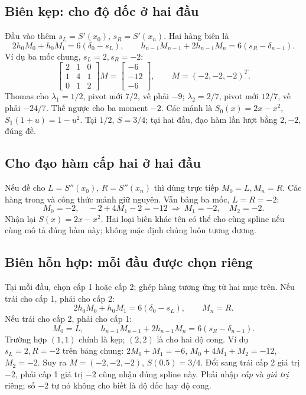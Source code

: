 \subsection{Biên kẹp: cho độ dốc ở hai đầu}
\label{sec:spline-clamped}
Đầu vào thêm $s_L=S'(x_0)$, $s_R=S'(x_n)$. Hai hàng biên là
\[
2h_0M_0+h_0M_1=6(\delta_0-s_L),\qquad
h_{n-1}M_{n-1}+2h_{n-1}M_n=6(s_R-\delta_{n-1}).
\]
Ví dụ ba mốc chung, $s_L=2,s_R=-2$:
\[
\begin{bmatrix}2&1&0\\1&4&1\\0&1&2\end{bmatrix}M
=\begin{bmatrix}-6\\-12\\-6\end{bmatrix},\qquad M=(-2,-2,-2)^T.
\]
Thomas cho $\lambda_1=1/2$, pivot mới $7/2$, vế phải $-9$;
$\lambda_2=2/7$, pivot mới $12/7$, vế phải $-24/7$.
Thế ngược cho ba moment $-2$.
Các mảnh là $S_0(x)=2x-x^2$, $S_1(1+u)=1-u^2$.
Tại $1/2$, $S=3/4$; tại hai đầu, đạo hàm lần lượt bằng $2,-2$, đúng đề.

\subsection{Cho đạo hàm cấp hai ở hai đầu}
\label{sec:spline-second}
Nếu đề cho $L=S''(x_0)$, $R=S''(x_n)$ thì dùng trực tiếp $M_0=L,M_n=R$.
Các hàng trong và công thức mảnh giữ nguyên.
Vẫn bảng ba mốc, $L=R=-2$:
\[
M_0=-2,\quad -2+4M_1-2=-12\ \Longrightarrow\ M_1=-2,\quad M_2=-2.
\]
Nhận lại $S(x)=2x-x^2$. Hai loại biên khác tên có thể cho cùng spline nếu cùng mô tả đúng hàm này; không mặc định chúng luôn tương đương.

\subsection{Biên hỗn hợp: mỗi đầu được chọn riêng}
\label{sec:spline-mixed}
Tại mỗi đầu, chọn cấp 1 hoặc cấp 2; ghép hàng tương ứng từ hai mục trên.
Nếu trái cho cấp 1, phải cho cấp 2:
\[
2h_0M_0+h_0M_1=6(\delta_0-s_L),\qquad M_n=R.
\]
Nếu trái cho cấp 2, phải cho cấp 1:
\[
M_0=L,\qquad h_{n-1}M_{n-1}+2h_{n-1}M_n=6(s_R-\delta_{n-1}).
\]
Trường hợp $(1,1)$ chính là kẹp; $(2,2)$ là cho hai độ cong.
Ví dụ $s_L=2,R=-2$ trên bảng chung:
$2M_0+M_1=-6$, $M_0+4M_1+M_2=-12$, $M_2=-2$.
Suy ra $M=(-2,-2,-2)$, $S(0.5)=3/4$.
Đổi sang trái cấp 2 giá trị $-2$, phải cấp 1 giá trị $-2$ cũng nhận đúng spline này.
Phải nhập \emph{cấp} và \emph{giá trị} riêng; số $-2$ tự nó không cho biết là độ dốc hay độ cong.

